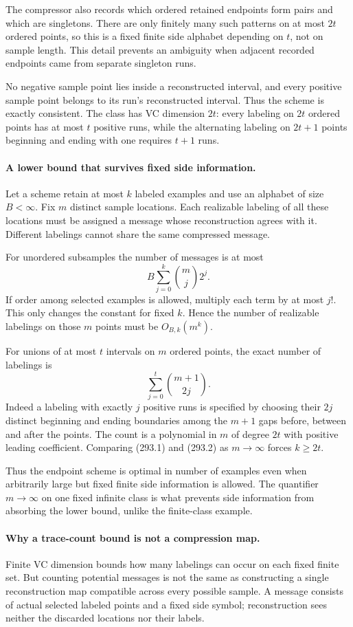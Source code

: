 \documentclass[11pt]{article}
\begin{document}
The compressor also records which ordered retained endpoints form pairs and which are singletons. There are only finitely many such patterns on at most $2t$ ordered points, so this is a fixed finite side alphabet depending on $t$, not on sample length. This detail prevents an ambiguity when adjacent recorded endpoints came from separate singleton runs.

No negative sample point lies inside a reconstructed interval, and every positive sample point belongs to its run's reconstructed interval. Thus the scheme is exactly consistent. The class has VC dimension $2t$: every labeling on $2t$ ordered points has at most $t$ positive runs, while the alternating labeling on $2t+1$ points beginning and ending with one requires $t+1$ runs.

\paragraph{A lower bound that survives fixed side information.}
Let a scheme retain at most $k$ labeled examples and use an alphabet of size $B<\infty$. Fix $m$ distinct sample locations. Each realizable labeling of all these locations must be assigned a message whose reconstruction agrees with it. Different labelings cannot share the same compressed message.

For unordered subsamples the number of messages is at most
\[
 B\sum_{j=0}^k\binom mj2^j.
 \tag{293.1}
\]
If order among selected examples is allowed, multiply each term by at most $j!$. This only changes the constant for fixed $k$. Hence the number of realizable labelings on those $m$ points must be $O_{B,k}(m^k)$.

For unions of at most $t$ intervals on $m$ ordered points, the exact number of labelings is
\[
 \sum_{j=0}^t\binom{m+1}{2j}.
 \tag{293.2}
\]
Indeed a labeling with exactly $j$ positive runs is specified by choosing their $2j$ distinct beginning and ending boundaries among the $m+1$ gaps before, between and after the points. The count is a polynomial in $m$ of degree $2t$ with positive leading coefficient. Comparing (293.1) and (293.2) as $m\to\infty$ forces $k\ge2t$.

Thus the endpoint scheme is optimal in number of examples even when arbitrarily large but fixed finite side information is allowed. The quantifier $m\to\infty$ on one fixed infinite class is what prevents side information from absorbing the lower bound, unlike the finite-class example.

\paragraph{Why a trace-count bound is not a compression map.}
Finite VC dimension bounds how many labelings can occur on each fixed finite set. But counting potential messages is not the same as constructing a single reconstruction map compatible across every possible sample. A message consists of actual selected labeled points and a fixed side symbol; reconstruction sees neither the discarded locations nor their labels.
\end{document}
